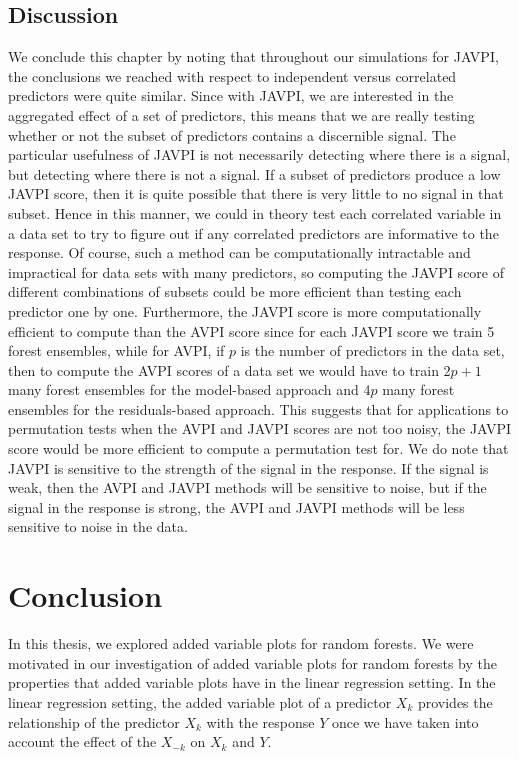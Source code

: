 \documentclass[12pt,twoside]{reedthesis}
\theoremstyle{definition}
\theoremstyle{definition}
\theoremstyle{definition}
\theoremstyle{remark}
\begin{document}
\section{Discussion}\label{discussion}

We conclude this chapter by noting that throughout our simulations for
JAVPI, the conclusions we reached with respect to independent versus
correlated predictors were quite similar. Since with JAVPI, we are
interested in the aggregated effect of a set of predictors, this means
that we are really testing whether or not the subset of predictors
contains a discernible signal. The particular usefulness of JAVPI is not
necessarily detecting where there is a signal, but detecting where there
is not a signal. If a subset of predictors produce a low JAVPI score,
then it is quite possible that there is very little to no signal in that
subset. Hence in this manner, we could in theory test each correlated
variable in a data set to try to figure out if any correlated predictors
are informative to the response. Of course, such a method can be
computationally intractable and impractical for data sets with many
predictors, so computing the JAVPI score of different combinations of
subsets could be more efficient than testing each predictor one by one.
Furthermore, the JAVPI score is more computationally efficient to
compute than the AVPI score since for each JAVPI score we train 5 forest
ensembles, while for AVPI, if \(p\) is the number of predictors in the
data set, then to compute the AVPI scores of a data set we would have to
train \(2p+1\) many forest ensembles for the model-based approach and
\(4p\) many forest ensembles for the residuals-based approach. This
suggests that for applications to permutation tests when the AVPI and
JAVPI scores are not too noisy, the JAVPI score would be more efficient
to compute a permutation test for. We do note that JAVPI is sensitive to
the strength of the signal in the response. If the signal is weak, then
the AVPI and JAVPI methods will be sensitive to noise, but if the signal
in the response is strong, the AVPI and JAVPI methods will be less
sensitive to noise in the data. \par 

\chapter*{Conclusion}\label{conclusion}

In this thesis, we explored added variable plots for random forests. We
were motivated in our investigation of added variable plots for random
forests by the properties that added variable plots have in the linear
regression setting. In the linear regression setting, the added variable
plot of a predictor \(X_k\) provides the relationship of the predictor
\(X_k\) with the response \(Y\) once we have taken into account the
effect of the \(X_{-k}\) on \(X_k\) and \(Y\). \par 
\end{document}
